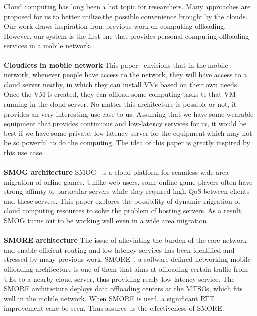 Cloud computing has long been a hot topic for researchers. Many approaches are proposed for us to better utilize the possible convenience brought by the clouds. Our work draws inspiration from previous work on computing offloading. However, our system is the first one that provides personal computing offloading services in a mobile network.\\\\
\textbf{Cloudlets in mobile network} This paper~\cite{cloudlets} envisions that in the mobile network, whenever people have access to the network, they will have access to a cloud server nearby, in which they can install VMs based on their own needs. Once the VM is created, they can offload some computing tasks to that VM running in the cloud server. No matter this architecture is possible or not, it provides an very interesting use case to us. Assuming that we have some wearable equipment that provides continuous and low-latency services for us, it would be best if we have some private, low-latency server for the equipment which may not be so powerful to do the computing. The idea of this paper is greatly inspired by this use case.\\\\
\textbf{SMOG architecture} SMOG~\cite{smog} is a cloud platform for seamless wide area migration of online games. Unlike web users, some online game players often have strong affinity to particular servers while they required high QoS between clients and these servers. This paper explores the possibility of dynamic migration of cloud computing resources to solve the problem of hosting servers. As a result, SMOG turns out to be working well even in a wide area migration.\\\\
\textbf{SMORE architecture} The issue of alleviating the burden of the core network and enable efficient routing and low-latency services has been identified and stressed by many previous work. SMORE~\cite{smore}, a software-defined networking mobile offloading architecture is one of them that aims at offloading certain traffic from UEs to a nearby cloud server, thus providing really low-latency service. The SMORE architecture deploys data offloading centers at the MTSOs, which fits well in the mobile network. When SMORE is used, a significant RTT improvement cane be seen. Thus assures us the effectiveness of SMORE.